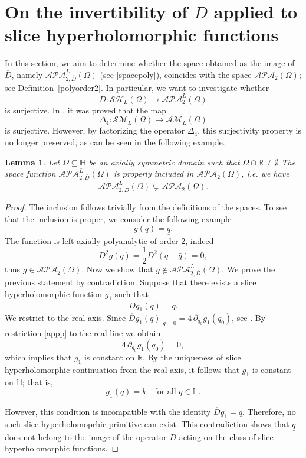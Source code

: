 \documentclass[reqno,11pt]{amsart}
\numberwithin{equation}{section}
\newtheorem{lemma}[theorem]{Lemma}
\theoremstyle{definition}
\begin{document}
\section{On the invertibility of $\overline{D}$ applied to slice hyperholomorphic functions}

In this section, we aim to determine whether the space obtained as the image of $\overline{D}$, namely $\mathcal{APA}^L_{2, \overline{D}}(\Omega)$ (see \eqref{spacepoly}), coincides with the space $\mathcal{APA}_2(\Omega)$; see Definition~\ref{polyorder2}. In particular, we want to investigate whether
\begin{equation}
\label{mapfine}
\overline{D}: \mathcal{SH}_L(\Omega) \longrightarrow \mathcal{APA}_2^L(\Omega)
\end{equation}
is surjective. In \cite{CSSOinverse}, it was proved that the map
$$
\Delta_4: \mathcal{SM}_L(\Omega) \to \mathcal{AM}_L(\Omega)
$$
is surjective. However, by factorizing the operator $\Delta_4$, this surjectivity property is no longer preserved, as can be seen in the following example.

\begin{lemma}
\label{inclusion}
Let $\Omega \subseteq \mathbb H$ be an axially symmetric domain such that $\Omega\cap\mathbb R\neq\emptyset$
The space function $\mathcal{APA}^L_{2, \overline{D}}(\Omega)$ is properly included in $\mathcal{APA}_2(\Omega)$, i.e. we have
$$ \mathcal{APA}^L_{2, \overline{D}}(\Omega) \subsetneq \mathcal{APA}_2(\Omega).$$
\end{lemma}
\begin{proof}
The inclusion follows trivially from the definitions of the spaces. To see that the inclusion is proper, we consider the following example
$$ g(q)=\underline{q}.$$
The function is left axially polyanalytic of order 2, indeed
$$ D^2 g(q)= \frac{1}{2} D^2(q-\bar{q})=0,$$
thus $g \in \mathcal{APA}_2(\Omega)$. Now we show that $g \notin \mathcal{APA}^L_{2, \overline{D}}(\Omega)$. We prove the previous statement by contradiction. Suppose that there exists a slice hyperholomorphic function $g_1$ such that
\begin{equation}
\label{appp}
\overline D g_1(q) = \underline{q}.
\end{equation}
We restrict to the real axis. Since $\overline D g_1(q)|_{\underline{q}=0}=4\,\partial_{q_0} g_1(q_0)$, see \cite[Thm. 4.10]{CDS2025}. By restriction \ref{appp} to the real line we obtain
$$
4\,\partial_{q_0} g_1(q_0) = 0,
$$
which implies that $ g_1$ is constant on $\mathbb{R} $. By the uniqueness of slice hyperholomorphic continuation from the real axis, it follows that $g_1$ is constant on $\mathbb{H}$; that is,
$$
g_1(q) = k \quad \text{for all } q \in \mathbb{H}.
$$

However, this condition is incompatible with the identity \( \overline D g_1 = \underline{q} \). Therefore, no such slice hyperholomoprhic primitive can exist. This contradiction shows that \( \underline{q} \) does not belong to the image of the operator \( \overline D \) acting on the class of slice hyperholomorphic functions.
\end{proof}
\end{document}
